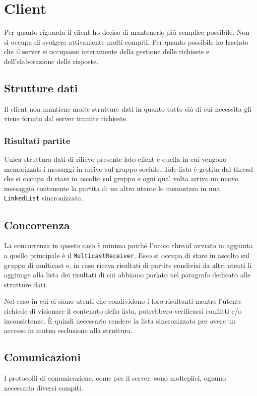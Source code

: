 \section{Client}
Per quanto riguarda il client ho deciso di mantenerlo più semplice possibile. Non si occupa di
svolgere attivamente molti compiti. Per quanto possibile ho lasciato che il server si occupasse
interamente della gestione delle richieste e dell'elaborazione delle risposte.

\subsection{Strutture dati}
Il client non mantiene molte strutture dati in quanto tutto ciò di cui necessita gli viene fornito
dal server tramite richieste.

\subsubsection{Risultati partite}
Unica struttura dati di rilievo presente lato client è quella in cui vengono memorizzati i
messaggi in arrivo sul gruppo sociale. Tale lista è gestita dal thread che si occupa di stare in
ascolto sul gruppo e ogni qual volta arriva un nuovo messaggio contenente la partita di un altro
utente lo memorizza in una \verb|LinkedList| sincronizzata.

\subsection{Concorrenza}
La concorrenza in questo caso è minima poiché l'unico thread avviato in aggiunta a quello
principale è il \verb|MulticastReceiver|. Esso si occupa di stare in ascolto sul gruppo di
multicast e, in caso riceva risultati di partite condivisi da altri utenti li aggiunge alla lista
dei risultati di cui abbiamo parlato nel paragrafo dedicato alle strutture dati.

Nel caso in cui ci siano utenti che condividono i loro risultanti mentre l'utente richiede di
visionare il contenuto della lista, potrebbero verificarsi conflitti e/o inconsistenze. \`E quindi
necessario rendere la lista sincronizzata per avere un accesso in mutua esclusione alla struttura.

\subsection{Comunicazioni}
I protocolli di comunicazione, come per il server, sono molteplici, ognuno necessario diversi
compiti.

